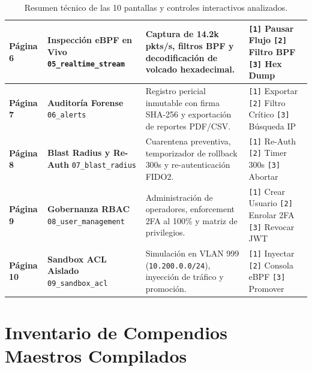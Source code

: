 \documentclass[11pt,a4paper]{article}
\begin{document}
\begin{table}[h!]
\begin{tabularx}{\textwidth}{lp{4cm}Xp{3.2cm}}
\midrule
\textbf{Página 6} & \textbf{Inspección eBPF en Vivo} \newline \texttt{05\_realtime\_stream} & Captura de 14.2k pkts/s, filtros BPF y decodificación de volcado hexadecimal. & \texttt{[1]} Pausar Flujo \newline \texttt{[2]} Filtro BPF \newline \texttt{[3]} Hex Dump \\
\midrule
\textbf{Página 7} & \textbf{Auditoría Forense} \newline \texttt{06\_alerts} & Registro pericial inmutable con firma SHA-256 y exportación de reportes PDF/CSV. & \texttt{[1]} Exportar \newline \texttt{[2]} Filtro Crítico \newline \texttt{[3]} Búsqueda IP \\
\midrule
\textbf{Página 8} & \textbf{Blast Radius y Re-Auth} \newline \texttt{07\_blast\_radius} & Cuarentena preventiva, temporizador de rollback 300s y re-autenticación FIDO2. & \texttt{[1]} Re-Auth \newline \texttt{[2]} Timer 300s \newline \texttt{[3]} Abortar \\
\midrule
\textbf{Página 9} & \textbf{Gobernanza RBAC} \newline \texttt{08\_user\_management} & Administración de operadores, enforcement 2FA al 100\% y matriz de privilegios. & \texttt{[1]} Crear Usuario \newline \texttt{[2]} Enrolar 2FA \newline \texttt{[3]} Revocar JWT \\
\midrule
\textbf{Página 10} & \textbf{Sandbox ACL Aislado} \newline \texttt{09\_sandbox\_acl} & Simulación en VLAN 999 (\texttt{10.200.0.0/24}), inyección de tráfico y promoción. & \texttt{[1]} Inyectar \newline \texttt{[2]} Consola eBPF \newline \texttt{[3]} Promover \\
\bottomrule
\end{tabularx}
\caption{Resumen técnico de las 10 pantallas y controles interactivos analizados.}
\end{table}

\newpage

\section{Inventario de Compendios Maestros Compilados}
\end{document}
